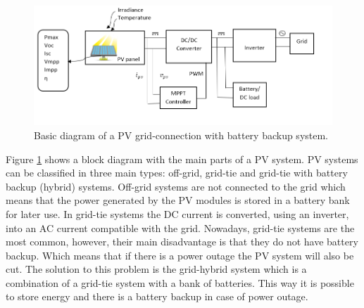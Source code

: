 \begin{figure}[htbp]
	\includegraphics[width=\linewidth]{../Pictures/PV_system_blocks}
	\caption{Basic diagram of a PV grid-connection with battery backup system.}
	\label{fig:PVsystemblocks}
\end{figure}

Figure \ref{fig:PVsystemblocks} shows a block diagram with the main parts of a PV system. PV systems can be classified in three main types: off-grid, grid-tie and grid-tie with battery backup (hybrid) systems. Off-grid systems are not connected to the grid which means that the power generated by the PV modules is stored in a battery bank for later use. In grid-tie systems the DC current is converted, using an inverter, into an AC current compatible with the grid. Nowadays, grid-tie systems are the most common, however, their main disadvantage is that they do not have battery backup. Which means that if there is a power outage the PV system will also be cut.  The solution to this problem is the grid-hybrid system which is a combination of a grid-tie system with a bank of batteries. This way it is possible to store energy and there is a battery backup in case of power outage. %
